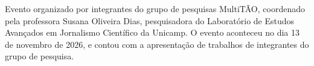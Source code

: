 Evento organizado por integrantes do grupo de pesquisas MultiTÃO, coordenado pela professora Susana Oliveira Dias, pesquisadora do Laboratório de Estudos Avançados em Jornalismo Científico da Unicamp. O evento aconteceu no dia 13 de novembro de 2026, e contou com a apresentação de trabalhos de integrantes do grupo de pesquisa.